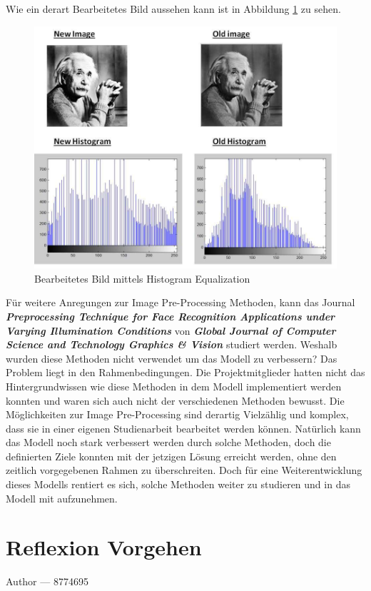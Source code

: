 \documentclass[12pt, a4paper]{report}
\makeatletter
\newcommand*\setcaptioncitation[1]{\def\captioncitation{\textit{Quelle:}~#1}}
\let\captioncitation\relax
\newcommand{\sectionauthor}[1]{%
  {\parindent0pt\vspace*{-5pt}%
  \large{Author --- }
  \linespread{1.1}\large\scshape#1%
  \par\nobreak\vspace*{35pt} }
  \@afterheading%
}
\makeatother
\begin{document}
Wie ein derart Bearbeitetes Bild aussehen kann ist in Abbildung \ref{fig:Histogramm} zu sehen.
\begin{figure}[h]
\includegraphics[width=\linewidth]{Bilder/Histogramm}
\setcaptioncitation{https://www.tutorialspoint.com/dip/histogram\_equalization.htm}
\caption{Bearbeitetes Bild mittels Histogram Equalization}
\label{fig:Histogramm}
\end{figure}
Für weitere Anregungen zur Image Pre-Processing Methoden, kann das Journal \textbf{\textit{Preprocessing Technique for Face Recognition Applications under Varying Illumination Conditions}} von \textbf{\textit{Global Journal of Computer Science and Technology Graphics \& Vision}} studiert werden.
\newline
Weshalb wurden diese Methoden nicht verwendet um das Modell zu verbessern? Das Problem liegt in den Rahmenbedingungen. Die Projektmitglieder hatten nicht das Hintergrundwissen wie diese Methoden in dem Modell implementiert werden konnten und waren sich auch nicht der verschiedenen Methoden bewusst. Die Möglichkeiten zur Image Pre-Processing sind derartig Vielzählig und komplex, dass sie in einer eigenen Studienarbeit bearbeitet werden können. Natürlich kann das Modell noch stark verbessert werden durch solche Methoden, doch die definierten Ziele konnten mit der jetzigen Lösung erreicht werden, ohne den zeitlich vorgegebenen Rahmen zu überschreiten.
Doch für eine Weiterentwicklung dieses Modells rentiert es sich, solche Methoden weiter zu studieren und in das Modell mit aufzunehmen.

\section{Reflexion Vorgehen}
\sectionauthor{8774695}
\end{document}
